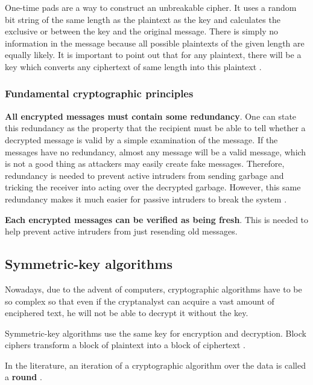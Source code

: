One-time pads are a way to construct an unbreakable cipher.
It uses a random bit string of the same length as the plaintext as the key and calculates the exclusive or between the key and the original message.
There is simply no information in the message because all possible plaintexts of the given length are equally likely.
It is important to point out that for any plaintext, there will be a key which converts any ciphertext of same length into this plaintext \cite[p.~772]{computer-networks-tanenbaum-2012}.

\subsubsection{Fundamental cryptographic principles}

\textbf{All encrypted messages must contain some redundancy}.
One can state this redundancy as the property that the recipient must be able to tell whether a decrypted message is valid by a simple examination of the message.
If the messages have no redundancy, almost any message will be a valid message, which is not a good thing as attackers may easily create fake messages.
Therefore, redundancy is needed to prevent active intruders from sending garbage and tricking the receiver into acting over the decrypted garbage.
However, this same redundancy makes it much easier for passive intruders to break the system \cite[p.~778]{computer-networks-tanenbaum-2012}.

\textbf{Each encrypted messages can be verified as being fresh}. This is needed to help prevent active intruders from just resending old messages.

\subsection{Symmetric-key algorithms}

Nowadays, due to the advent of computers, cryptographic algorithms have to be so complex so that even if the cryptanalyst can acquire a vast amount of enciphered text, he will not be able to decrypt it without the key.

Symmetric-key algorithms use the same key for encryption and decryption. Block ciphers transform a block of plaintext into a block of ciphertext \cite[p.~779]{computer-networks-tanenbaum-2012}.

In the literature, an iteration of a cryptographic algorithm over the data is called a \textbf{round} \cite[p.~780]{computer-networks-tanenbaum-2012}.

